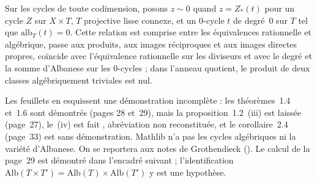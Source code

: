 \begin{encadre}
\begin{theoreme*}\nonverifie
Sur les cycles de toute codimension, posons $z \sim 0$ quand $z = Z_*(t)$ pour un cycle $Z$ sur $X \times T$, $T$ projective lisse connexe, et un $0$-cycle $t$ de degré~$0$ sur $T$ tel que $\mathrm{alb}_T(t) = 0$. Cette relation est comprise entre les équivalences rationnelle et algébrique, passe aux produits, aux images réciproques et aux images directes propres, coïncide avec l'équivalence rationnelle sur les diviseurs et avec le degré et la somme d'Albanese sur les $0$-cycles ; dans l'anneau quotient, le produit de deux classes algébriquement triviales est nul.
\end{theoreme*}
\end{encadre}
{\small Les feuillets en esquissent une démonstration incomplète : les théorèmes~1.4 et~1.6 sont démontrés (pages 28 et~29), mais la proposition~1.2~(iii) est laissée  (page~27), le~(iv) est fait , abréviation non reconstituée, et le corollaire~2.4 (page~33) est sans démonstration. Mathlib n'a pas les cycles algébriques ni la variété d'Albanese. On se reportera aux notes de Grothendieck (). Le calcul de la page~29 est démontré dans l'encadré suivant ; l'identification $\mathrm{Alb}(T \times T') = \mathrm{Alb}(T) \times \mathrm{Alb}(T')$ y est une hypothèse.\par}

